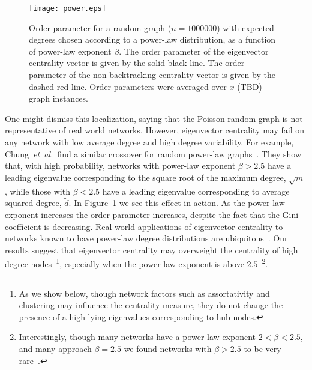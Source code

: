 \documentclass[twocolumn,prl,superscriptaddress]{revtex4}
\newcommand{\etal}{{\it{}et~al.}}
\newcommand\colora{black }
\newcommand\colorb{red }
\begin{document}
\begin{figure}
\begin{center}
\texttt{[image: power.eps]}
\end{center}
\caption{Order parameter for a random graph ($n=1000000$) with expected degrees chosen according to a power-law distribution, as a function of power-law exponent $\beta$. The order parameter of the eigenvector centrality vector is given by the solid \colora line. The order parameter of the non-backtracking centrality vector is given by the dashed \colorb line. Order parameters were averaged over $x$ (TBD) graph instances.}
\label{fig:power-law}
\end{figure}

One might dismiss this localization, saying that the Poisson random graph is not representative of real world networks. However, eigenvector centrality may fail on any network with low average degree and high degree variability. For example, Chung~\etal\ find a similar crossover for random power-law graphs~\cite{chung03}. They show that, with high probability, networks with power-law exponent $\beta > 2.5$ have a leading eigenvalue corresponding to the square root of the maximum degree, $\sqrt{m}$, while those with $\beta < 2.5$ have a leading eigenvalue corresponding to average squared degree, $\tilde{d}$. In Figure~\ref{fig:power-law} we see this effect in action. As the power-law exponent increases the order parameter increases, despite the fact that the Gini coefficient is decreasing. %
Real world applications of eigenvector centrality to networks known to have power-law degree distributions are ubiquitous~\cite{canright06,page99}. Our results suggest that eigenvector centrality may overweight the centrality of high degree nodes~\footnote{As we show below, though network factors such as assortativity and clustering may influence the centrality measure, they do not change the presence of a high lying eigenvalues corresponding to hub nodes.}, especially when the power-law exponent is above $2.5$~\footnote{Interestingly, though many networks have a power-law exponent $2 < \beta < 2.5$, and many approach $\beta = 2.5$ we found networks with $\beta > 2.5$ to be very rare~\cite{newman03}.}.
\end{document}
